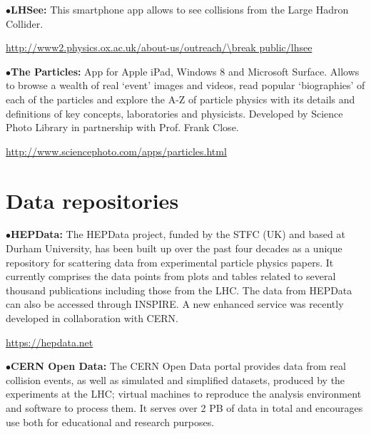 \medskip

\item{$\bullet$}{\bf LHSee:}
This smartphone app allows to see collisions from the Large Hadron Collider.
	\item{}\qquad\url{http://www2.physics.ox.ac.uk/about-us/outreach/\break public/lhsee}

\medskip

\item{$\bullet$}{\bf The Particles:}
App for Apple iPad, Windows 8 and Microsoft Surface. Allows to browse a wealth of real ‘event’ images and videos, read popular ‘biographies’ of each of the particles and explore the A-Z of particle physics with its details and definitions of key concepts, laboratories and physicists. Developed by Science Photo Library in partnership with Prof. Frank Close.
	\item{}\qquad\url{http://www.sciencephoto.com/apps/particles.html}


\section{Data repositories}  %

\medskip


\medskip

\item{$\bullet$}{\bf HEPData:} 
The HEPData project, funded by the STFC (UK) and based at Durham University, has been built up over the past four decades as a unique repository for scattering data from experimental particle physics papers.
It currently comprises the data points from plots and tables related to several thousand publications including those from the LHC.
The data from HEPData can also be accessed through INSPIRE. A new enhanced service was recently developed in collaboration with CERN.
	\item{}\qquad\url{https://hepdata.net}
\medskip

\item{$\bullet$}{\bf CERN Open Data:} 
The CERN Open Data portal provides data from real collision events, as well as simulated and simplified datasets, produced by the experiments at the LHC; virtual machines to reproduce the analysis environment and software to process them. It serves over 2 PB of data in total and encourages use both for educational and research purposes.

